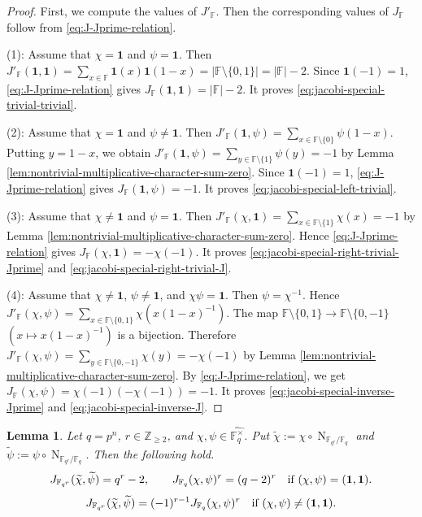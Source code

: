 \documentclass[10pt,a4paper]{article}
\newtheorem{lem}[thm]{Lemma}
\newcommand{\Norm}{\operatorname{N}}
\newcommand{\one}{\mathbf{1}}
\numberwithin{equation}{section}
\begin{document}
\begin{proof}
First, we compute the values of $J'_{\mathbb{F}}$. Then the corresponding values of $J_{\mathbb{F}}$ follow from \eqref{eq:J-Jprime-relation}.

\noindent\textup{(1)}: Assume that $\chi=\one$ and $\psi=\one$. Then
$J'_{\mathbb{F}}(\one,\one)=\sum_{x\in\mathbb{F}}\one(x)\one(1-x)=|\mathbb{F}\setminus\{0,1\}|=|\mathbb{F}|-2$.
Since $\one(-1)=1$, \eqref{eq:J-Jprime-relation} gives
$J_{\mathbb{F}}(\one,\one)=|\mathbb{F}|-2$.
It proves \eqref{eq:jacobi-special-trivial-trivial}.

\noindent\textup{(2)}: Assume that $\chi=\one$ and $\psi\neq\one$. Then $J'_{\mathbb{F}}(\one,\psi)=\sum_{x\in\mathbb{F}\setminus\{0\}}\psi(1-x)$. Putting $y=1-x$, we obtain $J'_{\mathbb{F}}(\one,\psi)=\sum_{y\in\mathbb{F}\setminus\{1\}}\psi(y)=-1$ by Lemma \ref{lem:nontrivial-multiplicative-character-sum-zero}. Since $\one(-1)=1$, \eqref{eq:J-Jprime-relation} gives $J_{\mathbb{F}}(\one,\psi)=-1$. It proves \eqref{eq:jacobi-special-left-trivial}.

\noindent\textup{(3)}: Assume that $\chi\neq\one$ and $\psi=\one$. Then $J'_{\mathbb{F}}(\chi,\one)=\sum_{x\in\mathbb{F}\setminus\{1\}}\chi(x)=-1$ by Lemma \ref{lem:nontrivial-multiplicative-character-sum-zero}. Hence \eqref{eq:J-Jprime-relation} gives $J_{\mathbb{F}}(\chi,\one)=-\chi(-1)$. It proves \eqref{eq:jacobi-special-right-trivial-Jprime} and \eqref{eq:jacobi-special-right-trivial-J}.

\noindent\textup{(4)}: Assume that $\chi\neq\one$, $\psi\neq\one$, and $\chi\psi=\one$. Then $\psi=\chi^{-1}$. Hence $J'_{\mathbb{F}}(\chi,\psi)=\sum_{x\in\mathbb{F}\setminus\{0,1\}}\chi(x(1-x)^{-1})$. The map $\mathbb{F}\setminus\{0,1\}\to \mathbb{F}\setminus\{0,-1\}$ $(x\mapsto x(1-x)^{-1})$ is a bijection. Therefore $J'_{\mathbb{F}}(\chi,\psi)=\sum_{y\in\mathbb{F}\setminus\{0,-1\}}\chi(y)=-\chi(-1)$ by Lemma \ref{lem:nontrivial-multiplicative-character-sum-zero}. By \eqref{eq:J-Jprime-relation}, we get $J_{\mathbb{F}}(\chi,\psi)=\chi(-1)(-\chi(-1))=-1$. It proves \eqref{eq:jacobi-special-inverse-Jprime} and \eqref{eq:jacobi-special-inverse-J}.
\end{proof}

\begin{lem}\label{lem:jacobi-norm-comparison}
Let $q=p^n$, $r\in \mathbb{Z}_{\ge 2}$, and $\chi,\psi\in\widehat{\mathbb{F}_q^\times}$. Put $\widetilde{\chi}:=\chi\circ\Norm_{\mathbb{F}_{q^r}/\mathbb{F}_q}$ and $\widetilde{\psi}:=\psi\circ\Norm_{\mathbb{F}_{q^r}/\mathbb{F}_q}$. Then the following hold.
\begin{equation}\label{eq:jacobi-norm-comparison-trivial}
J_{\mathbb{F}_{q^r}}(\widetilde{\chi},\widetilde{\psi})=q^r-2,
\qquad
J_{\mathbb{F}_q}(\chi,\psi)^r=(q-2)^r
\quad\textup{if }(\chi,\psi)=(\one,\one).
\end{equation}
\begin{equation}\label{eq:jacobi-norm-comparison-nontrivial}
J_{\mathbb{F}_{q^r}}(\widetilde{\chi},\widetilde{\psi})
=
(-1)^{r-1}J_{\mathbb{F}_q}(\chi,\psi)^r
\quad\textup{if }(\chi,\psi)\neq(\one,\one).
\end{equation}
\end{lem}
\end{document}
